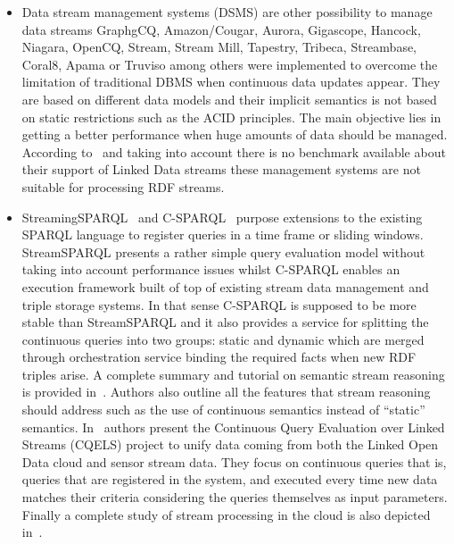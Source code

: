 \begin{itemize}
\item Data stream management systems (DSMS) are other possibility to manage data streams GraphgCQ, Amazon/Cougar, Aurora, Gigascope, 
Hancock, Niagara, OpenCQ, Stream, Stream Mill, Tapestry, Tribeca, Streambase, Coral8, Apama or Truviso among others were implemented to overcome the 
limitation of traditional DBMS when continuous data updates appear. They are based on different data models and their implicit semantics is not based on static 
restrictions such as the ACID principles. The main objective lies in getting a better performance when huge amounts of data should be managed. According to~\cite{deri2010} and 
taking into account there is no benchmark available about their support of Linked Data streams these management systems are not suitable for processing RDF streams. 


\item StreamingSPARQL~\cite{Bolles:2008:SSE:1789394.1789438} and 
C-SPARQL~\cite{Barbieri:2010:EEC:1739041.1739095} purpose extensions to the 
existing SPARQL language to register queries in a time frame or sliding windows. 
StreamSPARQL presents a rather simple query evaluation model without taking into 
account performance issues whilst C-SPARQL enables an execution framework built 
of top of existing stream data management and triple storage systems. In that 
sense C-SPARQL is supposed to be more stable than StreamSPARQL and it also 
provides a service for splitting the continuous queries into two groups: static 
and dynamic which are merged through orchestration service binding the required 
facts when new RDF triples arise. A complete summary and tutorial on semantic 
stream reasoning is provided in~\cite{stream-reasoning-linked-data}. Authors also outline all the features that 
stream reasoning should address such as the use of continuous semantics instead 
of ``static'' semantics. In~\cite{deri2010} authors present the Continuous Query Evaluation 
over Linked Streams (CQELS) project to unify data coming from both the Linked 
Open Data cloud and sensor stream data. They focus on continuous queries that 
is, queries that are registered in the system, and executed every time new data 
matches their criteria considering the queries themselves as input parameters. 
Finally a complete study of stream processing in the cloud 
is also depicted in~\cite{Backman:2012:MPS:2169090.2169091}.


\end{itemize}
